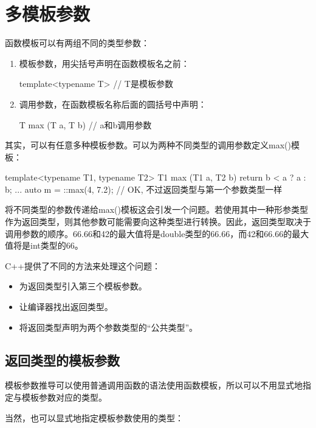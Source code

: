 \section{多模板参数}

函数模板可以有两组不同的类型参数：

\begin{enumerate}
\item 
模板参数，用尖括号声明在函数模板名之前：
\begin{cpp}
template<typename T> // T是模板参数
\end{cpp}

\item 
调用参数，在函数模板名称后面的圆括号中声明：
\begin{cpp}
T max (T a, T b) // a和b调用参数
\end{cpp}
\end{enumerate}

其实，可以有任意多种模板参数。可以为两种不同类型的调用参数定义max()模板：

\begin{cpp}
template<typename T1, typename T2>
T1 max (T1 a, T2 b)
{
	return b < a ? a : b;
}
...
auto m = ::max(4, 7.2); // OK, 不过返回类型与第一个参数类型一样
\end{cpp}

将不同类型的参数传递给max()模板这会引发一个问题。若使用其中一种形参类型作为返回类型，则其他参数可能需要向这种类型进行转换。因此，返回类型取决于调用参数的顺序。66.66和42的最大值将是double类型的66.66，而42和66.66的最大值将是int类型的66。

C++提供了不同的方法来处理这个问题：

\begin{itemize}
\item
为返回类型引入第三个模板参数。

\item
让编译器找出返回类型。

\item
将返回类型声明为两个参数类型的“公共类型”。
\end{itemize}

\subsection{返回类型的模板参数}

模板参数推导可以使用普通调用函数的语法使用函数模板，所以可以不用显式地指定与模板参数对应的类型。

当然，也可以显式地指定模板参数使用的类型：

